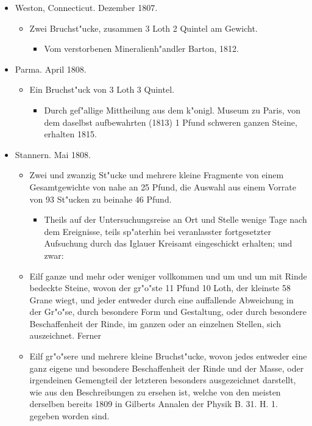 \documentclass[a4paper, 11pt, oneside, polutonikogreek, german]{article}
\begin{document}
\begin{itemize}
\begin{itemize}
    \end{itemize}
    \item Weston, Connecticut. Dezember 1807.
    \begin{itemize}
        \item Zwei Bruchst"ucke, zusammen 3 Loth 2 Quintel am Gewicht.
        \begin{itemize}
            \item Vom verstorbenen Mineralienh"andler Barton, 1812.
        \end{itemize}
    \end{itemize}
    \item Parma. April 1808.
    \begin{itemize}
        \item Ein Bruchst"uck von 3 Loth 3 Quintel.
        \begin{itemize}
            \item Durch gef"allige Mittheilung aus dem k"onigl. Museum zu Paris, von dem daselbst aufbewahrten (1813) 1 Pfund schweren ganzen Steine, erhalten 1815.
        \end{itemize}
    \end{itemize}
    \item Stannern. Mai 1808.
    \begin{itemize}
        \item Zwei und zwanzig St"ucke und mehrere kleine Fragmente von einem Gesamtgewichte von nahe an 25 Pfund, die Auswahl aus einem Vorrate von 93 St"ucken zu beinahe 46 Pfund.
        \begin{itemize}
            \item Theils auf der Untersuchungsreise an Ort und Stelle wenige Tage nach dem Ereignisse, teils sp"aterhin bei veranlasster fortgesetzter Aufsuchung durch das Iglauer Kreisamt eingeschickt erhalten; und zwar:
        \end{itemize}
        \item Eilf ganze und mehr oder weniger vollkommen und um und um mit Rinde bedeckte Steine, wovon der gr"o"ste 11 Pfund 10 Loth, der kleinste 58 Grane wiegt, und jeder entweder durch eine auffallende Abweichung in der Gr"o"se, durch besondere Form und Gestaltung, oder durch besondere Beschaffenheit der Rinde, im ganzen oder an einzelnen Stellen, sich auszeichnet. Ferner
        \item Eilf gr"o"sere und mehrere kleine Bruchst"ucke, wovon jedes entweder eine ganz eigene und besondere Beschaffenheit der Rinde und der Masse, oder irgendeinen Gemengteil der letzteren besonders ausgezeichnet darstellt, wie aus den Beschreibungen zu ersehen ist, welche von den meisten derselben bereits 1809 in Gilberts Annalen der Physik B. 31. H. 1. gegeben worden sind.

\end{itemize}
\end{itemize}
\end{document}
